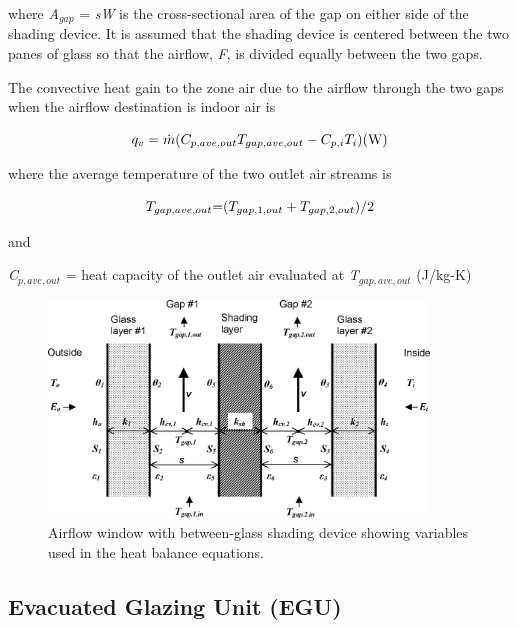 where \emph{A\(_{gap}\)} = \emph{sW} is the cross-sectional area of the gap on either side of the shading device. It is assumed that the shading device is centered between the two panes of glass so that the airflow, \emph{F}, is divided equally between the two gaps.

The convective heat gain to the zone air due to the airflow through the two gaps when the airflow destination is indoor air is

\begin{equation}
{q_v} = \dot m({C_{p,ave,out}}{T_{gap,ave,out}} - {C_{p,i}}{T_i}{\rm{)      (W)}}
\end{equation}

where the average temperature of the two outlet air streams is

\begin{equation}
{T_{gap,ave,out}}{\rm{ =  }}({T_{gap,1,out}} + {T_{gap,2,out}})/2
\end{equation}

and

\emph{C\(_{p,ave,out}\)} = heat capacity of the outlet air evaluated at \emph{T\(_{gap,ave,out}\)} (J/kg-K)

\begin{figure}[hbtp] %
\centering
\includegraphics[width=0.9\textwidth, height=0.9\textheight, keepaspectratio=true]{media/image1763.png}
\caption{Airflow window with between-glass shading device showing variables used in the heat balance equations. \protect \label{fig:airflow-window-with-between-glass-shading}}
\end{figure}

\subsection{Evacuated Glazing Unit (EGU)}\label{evacuated-glazing-unit-egu}

